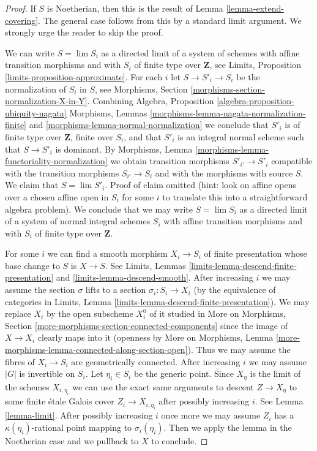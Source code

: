 \documentclass{stacks-project}
\theoremstyle{plain}
\theoremstyle{definition}
\theoremstyle{remark}
\numberwithin{equation}{subsection}
\def\lim{\mathop{\mathrm{lim}}\nolimits}
\begin{document}
\begin{proof}
If $S$ is Noetherian, then this is the result of
Lemma \ref{lemma-extend-covering}. The general case
follows from this by a standard limit argument.
We strongly urge the reader to skip the proof.

\medskip\noindent
We can write $S = \lim S_i$ as a directed limit of a system
of schemes with affine transition morphisms and with $S_i$ of
finite type over $\mathbf{Z}$, see
Limits, Proposition \ref{limits-proposition-approximate}.
For each $i$ let $S \to S'_i \to S_i$ be the normalization
of $S_i$ in $S$, see
Morphisms, Section \ref{morphisms-section-normalization-X-in-Y}.
Combining Algebra, Proposition \ref{algebra-proposition-ubiquity-nagata}
Morphisms, Lemmas \ref{morphisms-lemma-nagata-normalization-finite} and
\ref{morphisms-lemma-normal-normalization}
we conclude that $S'_i$ is of finite type over $\mathbf{Z}$,
finite over $S_i$, and that $S'_i$ is an integral normal
scheme such that $S \to S'_i$ is dominant.
By Morphisms, Lemma \ref{morphisms-lemma-functoriality-normalization}
we obtain transition morphisms $S'_{i'} \to S'_i$ compatible
with the transition morphisms $S_{i'} \to S_i$ and with
the morphisms with source $S$.
We claim that $S = \lim S'_i$. Proof of claim omitted (hint:
look on affine opens over a chosen affine open in $S_i$
for some $i$ to translate this into a straightforward algebra
problem). We conclude that we may write $S = \lim S_i$
as a directed limit of a system of normal integral schemes $S_i$
with affine transition morphisms and with $S_i$ of
finite type over $\mathbf{Z}$.

\medskip\noindent
For some $i$ we can find a smooth morphism $X_i \to S_i$
of finite presentation whose base change to $S$ is $X \to S$.
See Limits, Lemmas
\ref{limits-lemma-descend-finite-presentation} and
\ref{limits-lemma-descend-smooth}.
After increasing $i$ we may assume the section
$\sigma$ lifts to a section $\sigma_i : S_i \to X_i$
(by the equivalence of categories in
Limits, Lemma \ref{limits-lemma-descend-finite-presentation}).
We may replace $X_i$ by the open subscheme $X_i^0$
of it studied in More on Morphisms, Section
\ref{more-morphisms-section-connected-components}
since the image of $X \to X_i$ clearly maps into it
(openness by More on Morphisms, Lemma
\ref{more-morphisms-lemma-connected-along-section-open}).
Thus we may assume the fibres of $X_i \to S_i$ are
geometrically connected.
After increasing $i$ we may assume $|G|$ is invertible
on $S_i$.
Let $\eta_i \in S_i$ be the generic point.
Since $X_\eta$ is the limit of the schemes
$X_{i, \eta_i}$ we can use the exact same arguments
to descent $Z \to X_\eta$ to some finite \'etale Galois
cover $Z_i \to X_{i, \eta_i}$ after possibly increasing $i$.
See Lemma \ref{lemma-limit}.
After possibly increasing $i$ once more we may
assume $Z_i$ has a $\kappa(\eta_i)$-rational point
mapping to $\sigma_i(\eta_i)$.
Then we apply the lemma in the Noetherian case
and we pullback to $X$ to conclude.
\end{proof}
\end{document}
